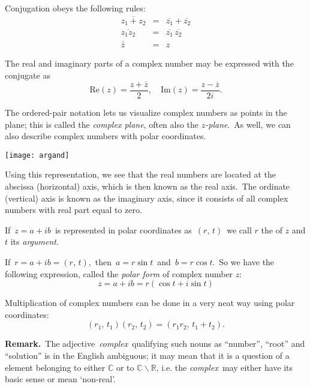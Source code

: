 \documentclass{article}
\begin{document}
Conjugation obeys the following rules:
\begin{eqnarray*}
\overline{z_1+z_2}&=&\overline{z_1}+\overline{z_2}\\
\overline{z_1z_2}&=&\overline{z_1}\,\overline{z_2}\\
\overline{\overline{z}}&=& z
\end{eqnarray*}

The real and imaginary parts of a complex number may be expressed with the conjugate as
$$\mbox{Re}(z) = \frac{z+\overline{z}}{2}, \quad \mbox{Im}(z) = \frac{z-\overline{z}}{2i}.$$


The ordered-pair notation lets us visualize complex numbers as points in the plane; this is called the {\em complex plane}, often also the {\em $z$-plane}.\, As well, we can also describe complex numbers with polar coordinates.
\begin{center}
\texttt{[image: argand]}
\end{center}
Using this representation, we see that the real numbers are located at the abscissa (horizontal) axis, which is then known as the real axis.\, The ordinate (vertical) axis is known as the imaginary axis, since it consists of all complex numbers with real part equal to zero.

If\, $z = a+ib$\, is represented in polar coordinates as\, $(r,\,t)$\, we call $r$ the  of $z$ and $t$ its \emph{argument}.

If\, $r = a+ib = (r,\,t)$,\, then\, $a = r\sin{t}$\, and\, $b = r\cos{t}$.\, So we have the following expression, called the {\em polar form} of complex number $z$:
$$z = a+ib = r(\cos{t}+i\sin{t})$$

Multiplication of complex numbers can be done in a very neat way using polar coordinates:
$$(r_1,\,t_1)(r_2,\,t_2) = (r_1r_2,\,t_1\!+\!t_2).$$

\textbf{Remark.}\, The adjective\, {\em complex}\, qualifying such nouns as ``number'', ``root'' and ``solution'' is in the English  ambiguous; it may mean that it is a question of a element belonging to either $\mathbb{C}$ or to $\mathbb{C}\!\smallsetminus\!\mathbb{R}$, i.e. the  {\em complex}\, may either have its basic sense or mean `non-real'.
\end{document}
